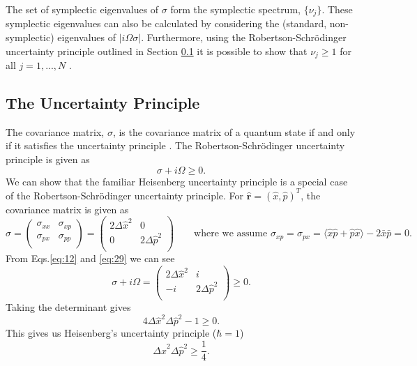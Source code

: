 \documentclass[11pt,a4paper,openbib]{article}
\numberwithin{equation}{section}
\begin{document}
The set of symplectic eigenvalues of $\sigma$ form the symplectic spectrum, $\{\nu_j\}$. These symplectic eigenvalues can also be calculated by considering the (standard, non-symplectic) eigenvalues of $\lvert i\Omega \sigma \lvert$. Furthermore, using the Robertson-Schr{\"o}dinger uncertainty principle outlined in Section \ref{sec:uncertainty} it is possible to show that $\nu_j\geq 1$ for all $j = 1, ..., N$ \cite{Serafini05}.

\subsection{The Uncertainty Principle}
\label{sec:uncertainty}
The covariance matrix, $\sigma$, is the covariance matrix of a quantum state if and only if it satisfies the uncertainty principle \cite{Simon94}. The Robertson-Schr{\"o}dinger uncertainty principle is given as \cite{Rob29, Sch30}
\begin{equation} \label{eq:29}
\sigma + i\Omega \geq 0.
\end{equation} 
We can show that the familiar Heisenberg uncertainty principle is a special case of the Robertson-Schr{\"o}dinger uncertainty principle. For $\mathbf{\hat{r}} = (\hat{x}, \hat{p})^T$, the covariance matrix is given as
\begin{equation*}
\sigma = 
\begin{pmatrix}
\sigma_{xx} & \sigma_{xp}  \\
\sigma_{px} & \sigma_{pp} \\
\end{pmatrix}
= 
\begin{pmatrix}
2\Delta\hat{x}^2 & 0  \\
0 & 2\Delta\hat{p}^2 \\
\end{pmatrix} \qquad\text{where we assume $\sigma_{xp}=\sigma_{px}= \langle \hat{x}\hat{p} + \hat{p}\hat{x} \rangle - 2\bar{x}\bar{p} = 0$}.
\end{equation*}
From Eqs.\ref{eq:12} and \ref{eq:29} we can see
\begin{equation*}
\sigma + i\Omega = 
\begin{pmatrix}
2\Delta\hat{x}^2 & i  \\
-i & 2\Delta\hat{p}^2 \\
\end{pmatrix} \geq 0.
\end{equation*}
Taking the determinant gives
\begin{equation*}
4\Delta\hat{x}^{2}\Delta\hat{p}^2 - 1 \geq 0.
\end{equation*}  
This gives us Heisenberg's uncertainty principle ($\hbar = 1$) \cite{Heisenberg27} 
\begin{equation*}
\Delta\hat{x}^{2}\Delta\hat{p}^2 \geq \frac{1}{4} .
\end{equation*}
\end{document}
